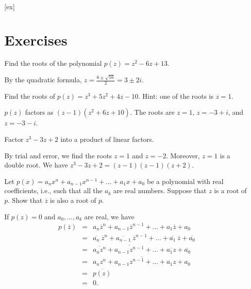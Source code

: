 [ex]
\section*{Exercises}


\begin{ex}
  Find the roots of the polynomial $p(z) = z^2-6z+13$.
  \begin{sol}
    By the quadratic formula, $\displaystyle z=\frac{6\pm\sqrt{16}}{2}
      = 3\pm 2i$.    
  \end{sol}
\end{ex}

\begin{ex}
  Find the roots of $p(z) = z^3 + 5z^2 + 4z - 10$. Hint: one of the
  roots is $z=1$.
  \begin{sol}
    $p(z)$ factors as $(z-1)(z^2+6z+10)$. The roots are $z=1$,
    $z=-3+i$, and $z=-3-i$.
  \end{sol}
\end{ex}

\begin{ex}
  Factor $z^3 - 3z + 2$ into a product of linear factors.
  \begin{sol}
    By trial and error, we find the roots $z=1$ and $z=-2$. Moreover,
    $z=1$ is a double root. We have $z^3 - 3z + 2 = (z-1)(z-1)(z+2)$.
  \end{sol}
\end{ex}

\begin{ex}
  Let $p(x) =a_{n}x^{n}+a_{n-1}x^{n-1}+\ldots+a_{1}x+a_{0}$ be a
  polynomial with real coefficients, i.e., such that all the $a_{k}$
  are real numbers. Suppose that $z$ is a root of $p$. Show that
  $\overline{z}$ is also a root of $p$. 
  \begin{sol}
    If $p(z) =0$ and $a_0,\ldots,a_k$ are real, we have
    \begin{eqnarray*}
      p(\overline{z})
      &=& a_{n}\overline{z}^{n}+a_{n-1}\overline{z}^{n-1}+\ldots +a_{1}\overline{z}          
          +a_{0} \\
      &=&\overline{a_{n}}\ \overline{z}^{n}+\overline{a_{n-1}}\ \overline{z}                
      ^{n-1}+\ldots +\overline{a_{1}}\ \overline{z}+\overline{a_{0}}
      \\
      &=& \overline{a_{n}z^{n}}+\overline{a_{n-1}z^{n-1}}+\ldots +\overline{a_{1}z}+         
          \overline{a_{0}} \\
      &=& \overline{a_{n}z^{n}+a_{n-1}z^{n-1}+\ldots+a_{1}z+a_{0}} \\
      &=& \overline{p(z) } \\
      &=& 0.
    \end{eqnarray*}
  \end{sol}
\end{ex}

